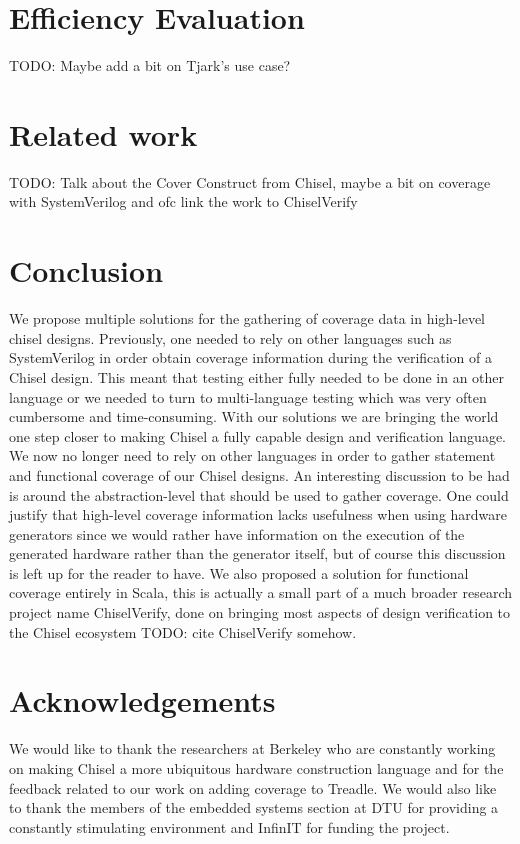 \documentclass[conference]{IEEEtran}
\newcommand{\todo}[1]{{\color{olive} TODO: #1}}
\begin{document}
\section{Efficiency Evaluation}
\todo{Maybe add a bit on Tjark's use case?}

\section{Related work}
\todo{Talk about the Cover Construct from Chisel, maybe a bit on coverage with SystemVerilog and ofc link the work to ChiselVerify}

\section{Conclusion}
We propose multiple solutions for the gathering of coverage data in high-level chisel designs. Previously, one needed to rely on other languages such as SystemVerilog in order obtain coverage information during the verification of a Chisel design. This meant that testing either fully needed to be done in an other language or we needed to turn to multi-language testing which was very often cumbersome and time-consuming. With our solutions we are bringing the world one step closer to making Chisel a fully capable design and verification language. We now no longer need to rely on other languages in order to gather statement and functional coverage of our Chisel designs. An interesting discussion to be had is around the abstraction-level that should be used to gather coverage. One could justify that high-level coverage information lacks usefulness when using hardware generators since we would rather have information on the execution of the generated hardware rather than the generator itself, but of course this discussion is left up for the reader to have. We also proposed a solution for functional coverage entirely in Scala, this is actually a small part of a much broader research project name ChiselVerify, done on bringing most aspects of design verification to the Chisel ecosystem\todo{cite ChiselVerify somehow}.

\section{Acknowledgements}
We would like to thank the researchers at Berkeley who are constantly working on making Chisel a more ubiquitous hardware construction language and for the feedback related to our work on adding coverage to Treadle. We would also like to thank the members of the embedded systems section at DTU for providing a constantly stimulating environment and InfinIT for funding the project.



\end{document}
